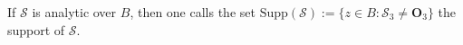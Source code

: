 If $\mathcal{S}$ is analytic over $B$, then one calls the set $\text{Supp}(\mathcal{S}) := \{z \in B : \mathcal{S}_3 \neq \mathbf{O}_3\}$ the support of $\mathcal{S}$.
